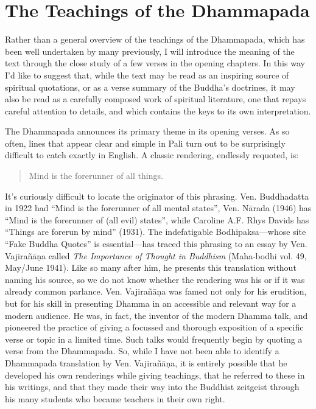 \documentclass[12pt,openany]{book}%
\begin{document}
\section*{The Teachings of the Dhammapada}

Rather than a general overview of the teachings of the Dhammapada, which has been well undertaken by many previously, I will introduce the meaning of the text through the close study of a few verses in the opening chapters. In this way I’d like to suggest that, while the text may be read as an inspiring source of spiritual quotations, or as a verse summary of the Buddha’s doctrines, it may also be read as a carefully composed work of spiritual literature, one that repays careful attention to details, and which contains the keys to its own interpretation.

The Dhammapada announces its primary theme in its opening verses. As so often, lines that appear clear and simple in Pali turn out to be surprisingly difficult to catch exactly in English. A classic rendering, endlessly requoted, is:

\begin{verse}%
Mind is the forerunner of all things.

%
\end{verse}

It’s curiously difficult to locate the originator of this phrasing. Ven. Buddhadatta in 1922 had “Mind is the forerunner of all mental states”, Ven. \textsanskrit{Nārada} (1946) has “Mind is the forerunner of (all evil) states”, while Caroline A.F. Rhys Davids has “Things are forerun by mind” (1931). The indefatigable Bodhipaksa—whose site “Fake Buddha Quotes” is essential—has traced this phrasing to an essay by Ven. \textsanskrit{Vajirañāṇa} called \textit{The Importance of Thought in Buddhism} (Maha-bodhi vol. 49, May/June 1941). Like so many after him, he presents this translation without naming his source, so we do not know whether the rendering was his or if it was already common parlance. Ven. \textsanskrit{Vajirañāṇa} was famed not only for his erudition, but for his skill in presenting Dhamma in an accessible and relevant way for a modern audience. He was, in fact, the inventor of the modern Dhamma talk, and pioneered the practice of giving a focussed and thorough exposition of a specific verse or topic in a limited time. Such talks would frequently begin by quoting a verse from the Dhammapada. So, while I have not been able to identify a Dhammapada translation by Ven. \textsanskrit{Vajirañāṇa}, it is entirely possible that he developed his own renderings while giving teachings, that he referred to these in his writings, and that they made their way into the Buddhist zeitgeist through his many students who became teachers in their own right.
\end{document}
